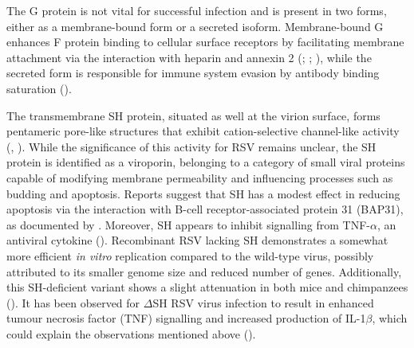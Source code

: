 The G protein is not vital for successful infection and is present in two forms, either as a membrane-bound form or a secreted isoform. Membrane-bound G enhances F protein binding to cellular surface receptors by facilitating membrane attachment via the interaction with heparin and annexin 2 (\cite{Collins2013RespiratoryDisease}; \cite{Krusat1997Heparin-dependentCells}; \cite{Malhotra2003IsolationCells}), while the secreted form is responsible for immune system evasion by antibody binding saturation (\cite{Bukreyev2008TheLeukocytes}). 

The transmembrane SH protein, situated as well at the virion surface, forms pentameric pore-like structures that exhibit cation-selective channel-like activity (\cite{Carter2010DirectPermeability.}, \cite{Gan2012TheChannels}). While the significance of this activity for RSV remains unclear, the SH protein is identified as a viroporin, belonging to a category of small viral proteins capable of modifying membrane permeability and influencing processes such as budding and apoptosis. Reports suggest that SH has a modest effect in reducing apoptosis via the interaction with B-cell receptor-associated protein 31 (BAP31), as documented by \cite{Fuentes2007FunctionProtein.}. Moreover, SH appears to inhibit signalling from TNF-\(\alpha\), an antiviral cytokine (\cite{Fuentes2007FunctionProtein.}). Recombinant RSV lacking SH demonstrates a somewhat more efficient \textit{in vitro} replication compared to the wild-type virus, possibly attributed to its smaller genome size and reduced number of genes. Additionally, this SH-deficient variant shows a slight attenuation in both mice and chimpanzees (\cite{Whitehead1999RecombinantChimpanzees}). It has been observed for \(\Delta\)SH RSV virus infection to result in enhanced tumour necrosis factor (TNF) signalling and increased production of IL-1\(\beta\), which could explain the observations mentioned above (\cite{Pollock2017ModulationProtein}). 

